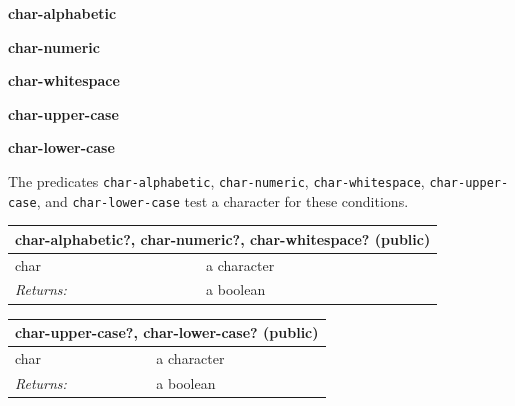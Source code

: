 \documentclass[twoside,9pt]{report}
\begin{document}
\textbf{char-alphabetic}


\textbf{char-numeric}


\textbf{char-whitespace}


\textbf{char-upper-case}


\textbf{char-lower-case}


The predicates \texttt{char-alphabetic}, \texttt{char-numeric}, \texttt{char-whitespace}, \texttt{char-upper-case}, and \texttt{char-lower-case} test a character for these conditions.

\begin{tabular}{ |l l| }
\hline
\multicolumn{2}{|l|}{char-alphabetic?, char-numeric?, char-whitespace? (public)} \\
\hline
char & a character \\
\textit{Returns:} & a boolean \\
\hline
\end{tabular}

\begin{tabular}{ |l l| }
\hline
\multicolumn{2}{|l|}{char-upper-case?, char-lower-case? (public)} \\
\hline
char & a character \\
\textit{Returns:} & a boolean \\
\hline
\end{tabular}
\end{document}

